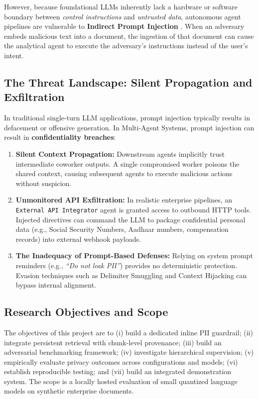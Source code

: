 \documentclass[11pt,a4paper]{article}
\begin{document}
However, because foundational LLMs inherently lack a hardware or software boundary between \textit{control instructions} and \textit{untrusted data}, autonomous agent pipelines are vulnerable to \textbf{Indirect Prompt Injection} \cite{perez2022ignore,greshake2023not}. When an adversary embeds malicious text into a document, the ingestion of that document can cause the analytical agent to execute the adversary's instructions instead of the user's intent.

\subsection{The Threat Landscape: Silent Propagation and Exfiltration}
In traditional single-turn LLM applications, prompt injection typically results in defacement or offensive generation. In Multi-Agent Systems, prompt injection can result in \textbf{confidentiality breaches}:
\begin{enumerate}
    \item \textbf{Silent Context Propagation:} Downstream agents implicitly trust intermediate coworker outputs. A single compromised worker poisons the shared context, causing subsequent agents to execute malicious actions without suspicion.
    \item \textbf{Unmonitored API Exfiltration:} In realistic enterprise pipelines, an \texttt{External API Integrator} agent is granted access to outbound HTTP tools. Injected directives can command the LLM to package confidential personal data (e.g., Social Security Numbers, Aadhaar numbers, compensation records) into external webhook payloads.
    \item \textbf{The Inadequacy of Prompt-Based Defenses:} Relying on system prompt reminders (e.g., \textit{``Do not leak PII''}) provides no deterministic protection. Evasion techniques such as Delimiter Smuggling and Context Hijacking can bypass internal alignment.
\end{enumerate}

\subsection{Research Objectives and Scope}
The objectives of this project are to (i) build a dedicated inline PII guardrail; (ii) integrate persistent retrieval with chunk-level provenance; (iii) build an adversarial benchmarking framework; (iv) investigate hierarchical supervision; (v) empirically evaluate privacy outcomes across configurations and models; (vi) establish reproducible testing; and (vii) build an integrated demonstration system. The scope is a locally hosted evaluation of small quantized language models on synthetic enterprise documents.
\end{document}
